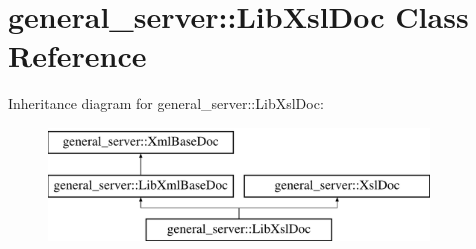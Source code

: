 \hypertarget{classgeneral__server_1_1LibXslDoc}{\section{general\-\_\-server\-:\-:\-Lib\-Xsl\-Doc \-Class \-Reference}
\label{classgeneral__server_1_1LibXslDoc}
}
\-Inheritance diagram for general\-\_\-server\-:\-:\-Lib\-Xsl\-Doc\-:\begin{figure}[H]
\begin{center}
\leavevmode
\includegraphics[height=3.000000cm]{classgeneral__server_1_1LibXslDoc}
\end{center}
\end{figure}
